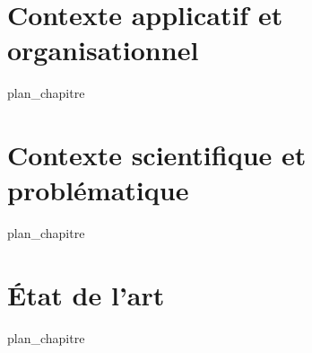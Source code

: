 %
\chapter{Contexte applicatif et organisationnel}
\label{chap:1}
{plan_chapitre}
%
\chapter{Contexte scientifique et problématique}
\label{chap:2}
{plan_chapitre}
%
\chapter{État de l'art}
\label{chap:3}
{plan_chapitre}
%

